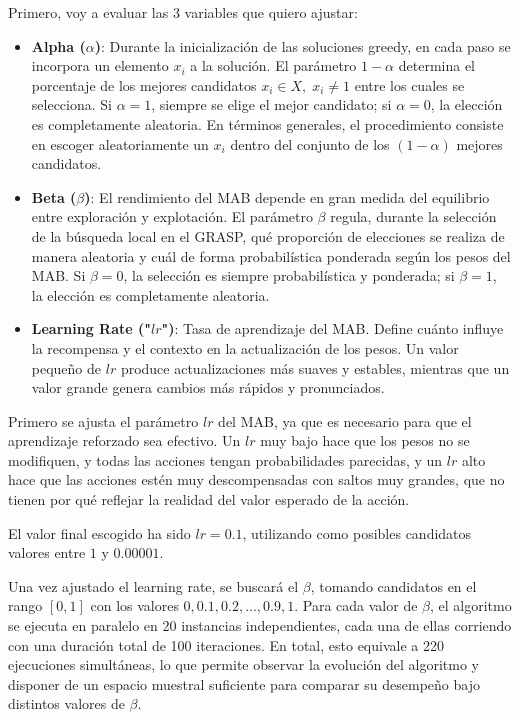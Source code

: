 \documentclass[12pt,a4paper]{book}
\begin{document}
Primero, voy a evaluar las 3 variables que quiero ajustar:
\begin{itemize}
    \item \textbf{Alpha ($\alpha$)}: Durante la inicialización de las soluciones greedy, en cada paso se incorpora un elemento $x_i$ a la solución. El parámetro $1-\alpha$ determina el porcentaje de los mejores candidatos $x_i \in X, \; x_i \neq 1$ entre los cuales se selecciona.  
Si $\alpha = 1$, siempre se elige el mejor candidato; si $\alpha = 0$, la elección es completamente aleatoria. En términos generales, el procedimiento consiste en escoger aleatoriamente un $x_i$ dentro del conjunto de los $(1-\alpha)$ mejores candidatos.
    \item \textbf{Beta ($\beta$)}: El rendimiento del MAB depende en gran medida del equilibrio entre exploración y explotación. El parámetro $\beta$ regula, durante la selección de la búsqueda local en el GRASP, qué proporción de elecciones se realiza de manera aleatoria y cuál de forma probabilística ponderada según los pesos del MAB.  
Si $\beta = 0$, la selección es siempre probabilística y ponderada; si $\beta = 1$, la elección es completamente aleatoria.
    \item \textbf{Learning Rate ("$lr$")}: Tasa de aprendizaje del MAB. Define cuánto influye la recompensa y el contexto en la actualización de los pesos. 
Un valor pequeño de $lr$ produce actualizaciones más suaves y estables, mientras que un valor grande genera cambios más rápidos y pronunciados.
\end{itemize}

Primero se ajusta el parámetro $lr$ del MAB, ya que es necesario para que el aprendizaje reforzado sea efectivo. Un $lr$ muy bajo hace que los pesos no se modifiquen, y todas las acciones tengan probabilidades parecidas, y un $lr$ alto hace que las acciones estén muy descompensadas con saltos muy grandes, que no tienen por qué reflejar la realidad del valor esperado de la acción.

El valor final escogido ha sido $lr=0.1$, utilizando como posibles candidatos valores entre $1$ y $0.00001$.

Una vez ajustado el learning rate, se buscará el $\beta$, tomando candidatos en el rango $[0,1]$ con los valores $0, 0.1, 0.2, \dots, 0.9, 1$.  
Para cada valor de $\beta$, el algoritmo se ejecuta en paralelo en 20 instancias independientes, cada una de ellas corriendo con una duración total de 100 iteraciones. 
En total, esto equivale a 220 ejecuciones simultáneas, lo que permite observar la evolución del algoritmo y disponer de un espacio muestral suficiente para comparar su desempeño bajo distintos valores de $\beta$.
\end{document}
